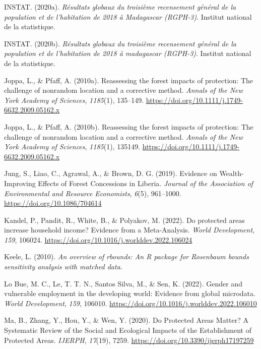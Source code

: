 \documentclass[
]{article}
\newlength{\cslhangindent}
\newenvironment{CSLReferences}[2] %
 {\begin{list}{}{%
  \setlength{\itemindent}{0pt}
  \setlength{\leftmargin}{0pt}
  \setlength{\parsep}{0pt}
  \ifodd #1
   \setlength{\leftmargin}{\cslhangindent}
   \setlength{\itemindent}{-1\cslhangindent}
  \fi
  \setlength{\itemsep}{#2\baselineskip}}}
 {\end{list}}
\begin{document}
\begin{CSLReferences}{1}{0}
INSTAT. (2020a). \emph{Résultats globaux du troisième recensement
général de la population et de l'habitation de 2018 à {Madagascar}
({RGPH}-3)}. Institut national de la statistique.

INSTAT. (2020b). \emph{Résultats globaux du troisième recensement
général de la population et de l'habitation de 2018 à madagascar
(RGPH-3)}. Institut national de la statistique.

Joppa, L., \& Pfaff, A. (2010a). Reassessing the forest impacts of
protection: {The} challenge of nonrandom location and a corrective
method. \emph{Annals of the New York Academy of Sciences},
\emph{1185}(1), 135--149.
\url{https://doi.org/10.1111/j.1749-6632.2009.05162.x}

Joppa, L., \& Pfaff, A. (2010b). Reassessing the forest impacts of
protection: The challenge of nonrandom location and a corrective method.
\emph{Annals of the New York Academy of Sciences}, \emph{1185}(1),
135149. \url{https://doi.org/10.1111/j.1749-6632.2009.05162.x}

Jung, S., Liao, C., Agrawal, A., \& Brown, D. G. (2019). Evidence on
{Wealth}-{Improving} {Effects} of {Forest} {Concessions} in {Liberia}.
\emph{Journal of the Association of Environmental and Resource
Economists}, \emph{6}(5), 961--1000.
\url{https://doi.org/10.1086/704614}

Kandel, P., Pandit, R., White, B., \& Polyakov, M. (2022). Do protected
areas increase household income? {Evidence} from a {Meta}-{Analysis}.
\emph{World Development}, \emph{159}, 106024.
\url{https://doi.org/10.1016/j.worlddev.2022.106024}

Keele, L. (2010). \emph{An overview of rbounds: {An} {R} package for
{Rosenbaum} bounds sensitivity analysis with matched data.}

Lo Bue, M. C., Le, T. T. N., Santos Silva, M., \& Sen, K. (2022). Gender
and vulnerable employment in the developing world: {Evidence} from
global microdata. \emph{World Development}, \emph{159}, 106010.
\url{https://doi.org/10.1016/j.worlddev.2022.106010}

Ma, B., Zhang, Y., Hou, Y., \& Wen, Y. (2020). Do {Protected} {Areas}
{Matter}? {A} {Systematic} {Review} of the {Social} and {Ecological}
{Impacts} of the {Establishment} of {Protected} {Areas}. \emph{IJERPH},
\emph{17}(19), 7259. \url{https://doi.org/10.3390/ijerph17197259}


\end{CSLReferences}
\end{document}
